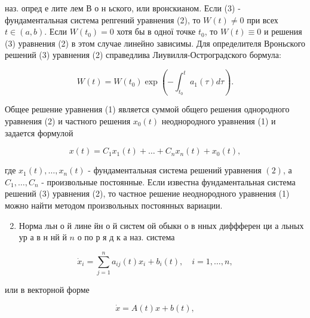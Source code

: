 \documentclass[10pt]{article}
\begin{document}
наз. опред е лите лем В о н ьского, или вронскианом. Если (3) - фундаментальная система репгений уравнения (2), то $W(t) \neq 0$ при всех $t \in(a, b)$. Если $W\left(t_{0}\right)=0$ хотя бы в одної точке $t_{0}$, то $W(t) \equiv 0$ и решения (3) уравнения (2) в этом случае линейно зависимы. Для определителя Вроньского решений (3) уравнения (2) справедлива Лиувилля-Остроградского бормула:



\[

W(t)=W\left(t_{0}\right) \exp \left(-\int_{t_{0}}^{t} a_{1}(\tau) d \tau\right) .

\]



Общее решение уравнения (1) является суммой общего решения однородного уравнения (2) и частного решения $x_{0}(t)$ неоднородного уравнения (1) и задается формулой



\[

x(t)=C_{1} x_{1}(t)+\ldots+C_{n} x_{n}(t)+x_{0}(t),

\]



где $x_{1}(t), \ldots, x_{n}(t)$ - фундаментальная система решений уравнения $(2)$, а $C_{1}, \ldots, C_{n}$ - произвольные постоянные. Если известна фундаментальная система решений (3) уравнения (2), то частное решение неоднородного уравнения (1) можно найти методом произвольных постоянных вариации.



\begin{enumerate}

  \setcounter{enumi}{1}

  \item Норма льн о й лине йн о й систем ой обыкн о в нных диффферен ци а льных ур а в н нй й $n$ о по р я д к а наз. система

\end{enumerate}



\[

\dot{x}_{i}=\sum_{j=1}^{n} a_{i j}(t) x_{i}+b_{i}(t), \quad i=1, \ldots, n,

\]



или в векторной форме



\[

\dot{x}=A(t) x+b(t),

\]
\end{document}
